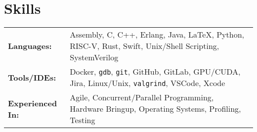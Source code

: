 \documentclass[10pt]{article}
\begin{document}





\section{Skills}
\begin{tabularx}{\linewidth}{@{}l X@{}}
    \textbf{Languages:} & Assembly, C, C++, Erlang, Java, \LaTeX, Python, RISC-V, Rust, Swift, Unix/Shell Scripting, SystemVerilog \\
    \textbf{Tools/IDEs:} & Docker, \texttt{gdb}, \texttt{git}, GitHub, GitLab, GPU/CUDA, Jira, Linux/Unix, \texttt{valgrind}, VSCode, Xcode \\
    \textbf{Experienced In:} & Agile, Concurrent/Parallel Programming, Hardware Bringup, Operating Systems, Profiling, Testing
\end{tabularx}
\end{document}
